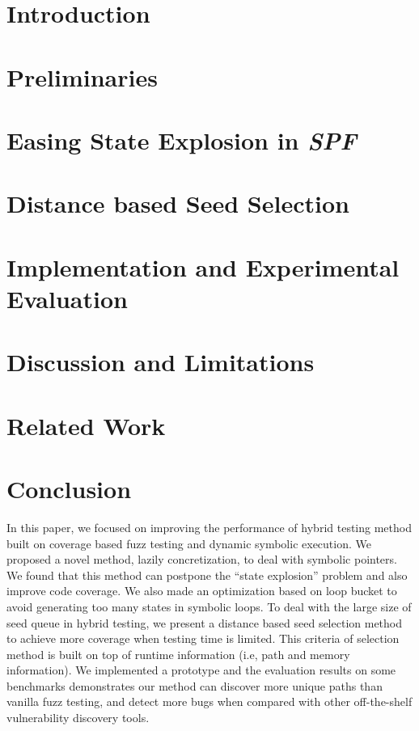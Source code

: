 \documentclass{cta-author}
\begin{document}
\section{Introduction} \label{sec:introduction}



\section{Preliminaries} \label{sec:preliminaries}


\section{Easing State Explosion in \textit{SPF}} \label{sec:ease PE}

%
\section{Distance based Seed Selection} \label{sec:seed selection}

%
\section{Implementation and Experimental Evaluation} \label{sec:evaluate}




\section{Discussion and Limitations} \label{sec:discussion}


\section{Related Work} \label{sec:related}


\section{Conclusion} \label{sec:conclusion}
In this paper, we focused on improving the performance of hybrid testing method built on coverage based fuzz testing and dynamic symbolic execution. We proposed a novel method, lazily concretization, to deal with symbolic pointers. We found that this method can postpone the ``state explosion'' problem and also improve code coverage. We also made an optimization based on loop bucket to avoid generating too many states in symbolic loops. To deal with the large size of seed queue in hybrid testing, we present a distance based seed selection method to achieve more coverage when testing time is limited. This criteria of selection method is built on top of runtime information (i.e, path and memory information). We implemented a prototype and the evaluation results on some benchmarks demonstrates our method can discover more unique paths than vanilla fuzz testing, and detect more bugs when compared with other off-the-shelf vulnerability discovery tools.
\end{document}
